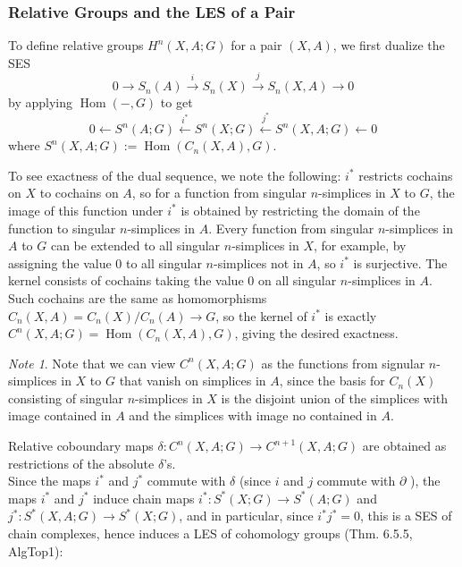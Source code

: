 \documentclass[reqno]{amsart}
\theoremstyle{definition}
\theoremstyle{remark}
\newtheorem*{note}{Note}
\DeclareMathOperator{\Hom}{Hom}
\begin{document}
     \subsubsection{Relative Groups and the LES of a Pair}

     To define relative groups
     $H^{n}(X,A;G)$ for a pair $(X,A)$, we first
     dualize the SES
     \[
     0 \to S_n(A) \stackrel{i}{\to} 
     S_n(X) \stackrel{j}{\to} 
     S_n(X,A) \to 0
     \] 
     by applying $\Hom(-,G)$ to get
     \[
     0 \leftarrow S^{n}(A;G) 
     \stackrel{i^{*}}{\leftarrow}
     S^{n}(X;G) \stackrel{j^{*}}{\leftarrow}
     S^{n}(X,A;G) \leftarrow 0 \tag{$\Omega$}\label{Omega}
     \] 
     where 
     $S^{n}(X,A;G) := \Hom \left( C_n (X,A),G \right) $.

     To see exactness of the dual sequence,
     we note the following:
     $i^{*}$ restricts cochains on $X$ to cochains
     on $A$, so for a function
     from singular $n$-simplices in $X$ to $G$, the
     image of this function under
     $i^{*}$ is obtained by restricting the domain of the
     function to singular $n$-simplices in $A$.
     Every function from singular $n$-simplices in $A$
     to $G$ can be extended to all singular $n$-simplices
     in  $X$, for example, by assigning the value
     $0$ to all singular $n$-simplices not in  $A$, so
     $i^{*}$ is surjective. The kernel consists
     of cochains taking the value $0$ on all
     singular $n$-simplices in $A$.
     Such cochains are the same as
     homomorphisms $C_n (X,A) =
     C_n (X) / C_n(A) \to G$, so the kernel
     of $i^{*}$ is exactly $C^{n}(X,A;G) = 
     \Hom\left( C_n(X,A),G \right) $, giving the desired
     exactness.

     \begin{note}
         Note that we can view $C^{n}(X,A;G)$ as the
         functions from signular $n$-simplices in
         $X$ to $G$ that vanish on simplices
         in $A$, since the basis for $C_n(X)$ consisting
         of singular $n$-simplices in $X$ 
         is the disjoint union of the simplices
         with image contained in $A$ and the simplices
         with image no contained in $A$.
     \end{note}

     Relative coboundary maps
     $\delta \colon C^{n}(X,A;G) \to 
     C^{n+1}(X,A;G)$ are obtained as restrictions
     of the absolute $\delta$'s.\\
     \linebreak
     Since the maps
     $i^{*}$ and $j^{*}$ commute with
     $\delta$ (since $i$ and $j$ commute with $\partial$ ),
     the maps $i^{*}$ and $j^{*}$ induce
     chain maps
     $i^{*} \colon S^{*}(X;G) \to S^{*}(A;G)$ and
     $j^{*} \colon S^{*}(X,A;G) \to 
     S^{*}(X;G)$, and in particular, since
     $i^{*} j^{*} = 0$, this is a SES of
     chain complexes, hence induces a LES
     of cohomology groups (Thm. 6.5.5, AlgTop1):
\end{document}
